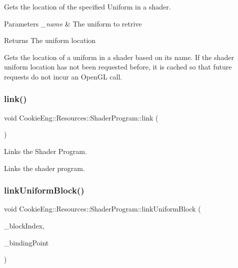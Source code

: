 Gets the location of the specified Uniform in a shader. 


\begin{DoxyParams}{Parameters}
{\em \+\_\+name} & The uniform to retrive \\
\hline
\end{DoxyParams}
\begin{DoxyReturn}{Returns}
The uniform location
\end{DoxyReturn}
Gets the location of a uniform in a shader based on its name. If the shader uniform location has not been requested before, it is cached so that future requests do not incur an Open\+GL call. \mbox{\label{class_cookie_eng_1_1_resources_1_1_shader_program_ac1c103a1f174c4053a94b65e4f32ccfc}} 
\subsubsection{\texorpdfstring{link()}{link()}}
{\footnotesize\ttfamily void Cookie\+Eng\+::\+Resources\+::\+Shader\+Program\+::link (\begin{DoxyParamCaption}{ }\end{DoxyParamCaption})}



Links the Shader Program. 

Links the shader program. \mbox{\label{class_cookie_eng_1_1_resources_1_1_shader_program_af298d334a9c678b7e1c8e32403a91d92}} 
\subsubsection{\texorpdfstring{link\+Uniform\+Block()}{linkUniformBlock()}}
{\footnotesize\ttfamily void Cookie\+Eng\+::\+Resources\+::\+Shader\+Program\+::link\+Uniform\+Block (\begin{DoxyParamCaption}\item[{const std\+::string \&}]{\+\_\+block\+Index,  }\item[{G\+Luint}]{\+\_\+binding\+Point }\end{DoxyParamCaption})}



